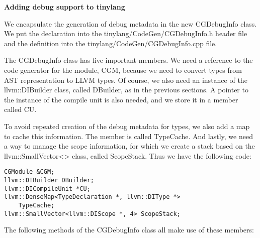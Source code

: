 \hspace*{\fill} \par %
\textbf{Adding debug support to tinylang}

We encapsulate the generation of debug metadata in the new CGDebugInfo class. We put the declaration into the tinylang/CodeGen/CGDebugInfo.h header file and the definition into the tinylang/CodeGen/CGDebugInfo.cpp file.\par

The CGDebugInfo class has five important members. We need a reference to the code generator for the module, CGM, because we need to convert types from AST representation to LLVM types. Of course, we also need an instance of the llvm::DIBuilder class, called DBuilder, as in the previous sections. A pointer to the instance of the compile unit is also needed, and we store it in a member called CU.\par

To avoid repeated creation of the debug metadata for types, we also add a map to cache this information. The member is called TypeCache. And lastly, we need a way to manage the scope information, for which we create a stack based on the llvm::SmallVector<> class, called ScopeStack. Thus we have the following code:\par

\begin{lstlisting}[caption={}]
CGModule &CGM;
llvm::DIBuilder DBuilder;
llvm::DICompileUnit *CU;
llvm::DenseMap<TypeDeclaration *, llvm::DIType *>
	TypeCache;
llvm::SmallVector<llvm::DIScope *, 4> ScopeStack;
\end{lstlisting}

The following methods of the CGDebugInfo class all make use of these members:\par

